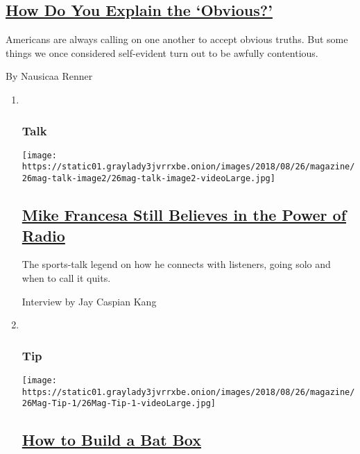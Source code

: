 \begin{enumerate}
  \hypertarget{how-do-you-explain-the-obvious}{%
  \subsection{\texorpdfstring{\href{/2018/08/21/magazine/how-do-you-explain-the-obvious.html}{How
  Do You Explain the
  `Obvious?'}}{How Do You Explain the `Obvious?'}}\label{how-do-you-explain-the-obvious}}

  Americans are always calling on one another to accept obvious truths.
  But some things we once considered self-evident turn out to be awfully
  contentious.

  By Nausicaa Renner
\end{enumerate}

\begin{enumerate}
\def\labelenumi{\arabic{enumi}.}
\item ~
  \hypertarget{talk}{%
  \subsubsection{Talk}\label{talk}}

  \texttt{[image: https://static01.graylady3jvrrxbe.onion/images/2018/08/26/magazine/26mag-talk-image2/26mag-talk-image2-videoLarge.jpg]}

  \hypertarget{mike-francesa-still-believes-in-the-power-of-radio}{%
  \subsection{\texorpdfstring{\href{/2018/08/22/magazine/mike-francesa-still-believes-in-the-power-of-radio.html}{Mike
  Francesa Still Believes in the Power of
  Radio}}{Mike Francesa Still Believes in the Power of Radio}}\label{mike-francesa-still-believes-in-the-power-of-radio}}

  The sports-talk legend on how he connects with listeners, going solo
  and when to call it quits.

  Interview by Jay Caspian Kang
\item ~
  \hypertarget{tip}{%
  \subsubsection{Tip}\label{tip}}

  \texttt{[image: https://static01.graylady3jvrrxbe.onion/images/2018/08/26/magazine/26Mag-Tip-1/26Mag-Tip-1-videoLarge.jpg]}

  \hypertarget{how-to-build-a-bat-box}{%
  \subsection{\texorpdfstring{\href{/2018/08/21/magazine/how-to-build-a-bat-box.html}{How
  to Build a Bat
  Box}}{How to Build a Bat Box}}\label{how-to-build-a-bat-box}}


\end{enumerate}
